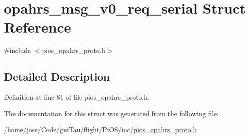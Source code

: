 \hypertarget{structopahrs__msg__v0__req__serial}{\section{opahrs\-\_\-msg\-\_\-v0\-\_\-req\-\_\-serial Struct Reference}
\label{structopahrs__msg__v0__req__serial}
}


{\ttfamily \#include $<$pios\-\_\-opahrs\-\_\-proto.\-h$>$}



\subsection{Detailed Description}


Definition at line 81 of file pios\-\_\-opahrs\-\_\-proto.\-h.



The documentation for this struct was generated from the following file\-:\begin{DoxyCompactItemize}
\item 
/home/jose/\-Code/gui\-Tau/flight/\-Pi\-O\-S/inc/\hyperlink{pios__opahrs__proto_8h}{pios\-\_\-opahrs\-\_\-proto.\-h}\end{DoxyCompactItemize}
